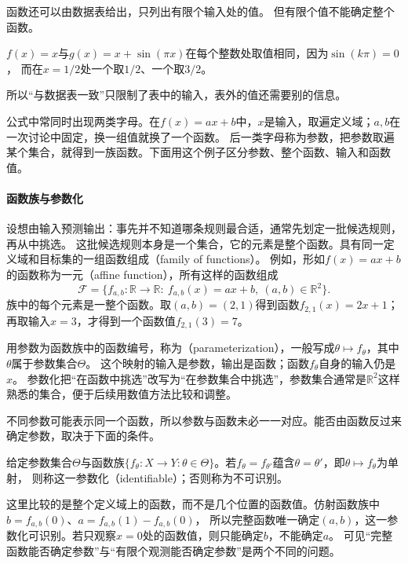 函数还可以由数据表给出，只列出有限个输入处的值。
但有限个值不能确定整个函数。
\begin{example}[在整数处取值相同的两个函数]
\label{ex:ru-finite-values-not-determine-function}
$f(x)=x$与$g(x)=x+\sin(\pi x)$在每个整数处取值相同，因为$\sin(k\pi)=0$，
而在$x=1/2$处一个取$1/2$、一个取$3/2$。
\end{example}
所以“与数据表一致”只限制了表中的输入，表外的值还需要别的信息。

公式中常同时出现两类字母。在$f(x)=ax+b$中，$x$是输入，取遍定义域；$a,b$在一次讨论中固定，换一组值就换了一个函数。
后一类字母称为参数，把参数取遍某个集合，就得到一族函数。下面用这个例子区分参数、整个函数、输入和函数值。

\paragraph{函数族与参数化}
\label{sec:prelim-function-families}
设想由输入预测输出：事先并不知道哪条规则最合适，通常先划定一批候选规则，再从中挑选。
这批候选规则本身是一个集合，它的元素是整个函数。具有同一定义域和目标集的一组函数组成（family of functions）。
例如，形如$f(x)=ax+b$的函数称为一元（affine function），所有这样的函数组成
\[
 \mathcal F=\{f_{a,b}:\mathbb R\to\mathbb R:\ f_{a,b}(x)=ax+b,\ (a,b)\in\mathbb R^2\}.
\]
族中的每个元素是一整个函数。取$(a,b)=(2,1)$得到函数$f_{2,1}(x)=2x+1$；再取输入$x=3$，才得到一个函数值$f_{2,1}(3)=7$。

用参数为函数族中的函数编号，称为（parameterization），一般写成$\theta\mapsto f_\theta$，其中$\theta$属于参数集合$\Theta$。
这个映射的输入是参数，输出是函数；函数$f_\theta$自身的输入仍是$x$。
参数化把“在函数中挑选”改写为“在参数集合中挑选”，参数集合通常是$\mathbb R^2$这样熟悉的集合，便于后续用数值方法比较和调整。

不同参数可能表示同一个函数，所以参数与函数未必一一对应。能否由函数反过来确定参数，取决于下面的条件。
\begin{definition}[函数参数化的可识别性]
\label{def:prelim-identifiable-parameterization}
给定参数集合$\Theta$与函数族$\{f_\theta:X\to Y:\theta\in\Theta\}$。若$f_\theta=f_{\theta'}$蕴含$\theta=\theta'$，即$\theta\mapsto f_\theta$为单射，
则称这一参数化（identifiable）；否则称为不可识别。
\end{definition}
这里比较的是整个定义域上的函数，而不是几个位置的函数值。仿射函数族中$b=f_{a,b}(0)$、$a=f_{a,b}(1)-f_{a,b}(0)$，
所以完整函数唯一确定$(a,b)$，这一参数化可识别。若只观察$x=0$处的函数值，则只能确定$b$，不能确定$a$。
可见“完整函数能否确定参数”与“有限个观测能否确定参数”是两个不同的问题。

